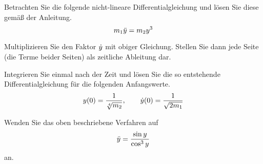 \begin{atiTask}[
title = Die Methode des Energiesatzes
]
  \begin{atiSubtasks}
    \item{
      Betrachten Sie die folgende nicht-lineare Differentialgleichung und lösen Sie diese gemäß der Anleitung.
      \[
        m_1 \ddot{y} = m_2y^3
      \]
      \begin{atiItems}
        \item{
          Multiplizieren Sie den Faktor $\dot{y}$ mit obiger Gleichung.
          Stellen Sie dann jede Seite (die Terme beider Seiten) als zeitliche Ableitung dar.
        }
        \item{
          Integrieren Sie einmal nach der Zeit und lösen Sie die so entstehende Differentialgleichung für die folgenden Anfangswerte.
          \[
            y(0) = \frac{1}{\sqrt[4]{m_2}} ,\qquad \dot{y}(0) = \frac{1}{\sqrt{2m_1}}
          \]
        }
      \end{atiItems}
    }
    \item{
      Wenden Sie das oben beschriebene Verfahren auf
      \[
        \ddot{y} = \frac{\sin y}{\cos^3 y}
      \]
      an.
    }
  \end{atiSubtasks}
\end{atiTask}